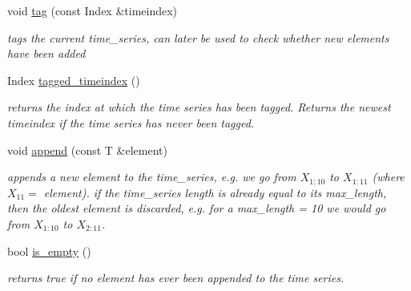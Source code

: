 \begin{DoxyCompactItemize}
\mbox{\label{classtime__series_1_1internal_1_1TimeSeriesBase_ad20c1f90dd2f9016f32132caa3f976f7}} 
void \hyperlink{classtime__series_1_1internal_1_1TimeSeriesBase_ad20c1f90dd2f9016f32132caa3f976f7}{tag} (const Index \&timeindex)
\begin{DoxyCompactList}\small\item\em tags the current time\+\_\+series, can later be used to check whether new elements have been added \end{DoxyCompactList}\item 
\mbox{\label{classtime__series_1_1internal_1_1TimeSeriesBase_adadeeff6e42776853e26aa5f74264909}} 
Index \hyperlink{classtime__series_1_1internal_1_1TimeSeriesBase_adadeeff6e42776853e26aa5f74264909}{tagged\+\_\+timeindex} ()
\begin{DoxyCompactList}\small\item\em returns the index at which the time series has been tagged. Returns the newest timeindex if the time series has never been tagged. \end{DoxyCompactList}\item 
\mbox{\label{classtime__series_1_1internal_1_1TimeSeriesBase_a09293ae95cdc492e7de78729b0e0e398}} 
void \hyperlink{classtime__series_1_1internal_1_1TimeSeriesBase_a09293ae95cdc492e7de78729b0e0e398}{append} (const T \&element)
\begin{DoxyCompactList}\small\item\em appends a new element to the time\+\_\+series, e.\+g. we go from $ X_{1:10} $ to $ X_{1:11} $ (where $ X_{11}=$ element). if the time\+\_\+series length is already equal to its max\+\_\+length, then the oldest element is discarded, e.\+g. for a max\+\_\+length = 10 we would go from $ X_{1:10} $ to $ X_{2:11} $. \end{DoxyCompactList}\item 
\mbox{\label{classtime__series_1_1internal_1_1TimeSeriesBase_acc3fa7fbde0873597358b70d41b7dbd2}} 
bool \hyperlink{classtime__series_1_1internal_1_1TimeSeriesBase_acc3fa7fbde0873597358b70d41b7dbd2}{is\+\_\+empty} ()
\begin{DoxyCompactList}\small\item\em returns true if no element has ever been appended to the time series. \end{DoxyCompactList}\end{DoxyCompactItemize}
